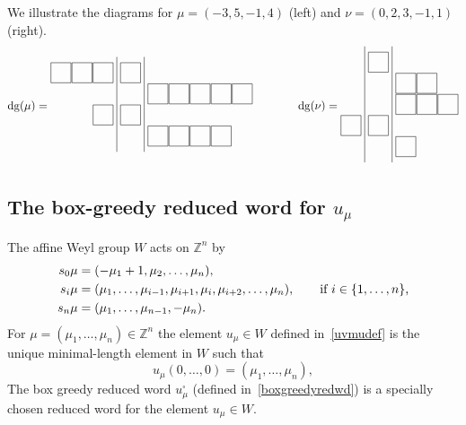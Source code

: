\documentclass[11pt]{article}
\theoremstyle{plain}
\theoremstyle{definition}
\newenvironment{example}
  {\pushQED{\qed}\exampleinner}
  {\popQED\endexampleinner}
\theoremstyle{remark}
\numberwithin{equation}{section}
\newcommand{\dg}{\mathrm{dg}}
\def\ZZ{\mathbb{Z}}
\newcounter{r}
\newcounter{s}
\begin{document}
\begin{example}
We illustrate the diagrams for $\mu = (-3,5,-1,4)$ (left) and $\nu = (0,2,3,-1,1)$ (right). 
$$
\dg(\mu)= \begin{matrix}
\begin{tikzpicture}[scale = 0.65]
\foreach \x\y in {1/-3, 1/-2, 1/-1, 1/0, 2/1, 2/2, 2/3, 2/4, 2/5, 3/-1, 3/0, 4/1, 4/2, 4/3, 4/4}{
    \pgfmathtruncatemacro{\shift}{(\y>0) - (\y<0)}
    \begin{scope}[xshift = 0.3*\shift cm]
    \draw[thin] (\y+0.025, -\x-0.025) rectangle (0.975+\y, -\x-0.975);
    \draw (0.5+\y,-\x-0.5) node (\x\y) {};
    \end{scope}
}
\draw (-0.15, -0.75) -- (-0.15, -5.25);
\draw (1.15, -0.75) -- (1.15, -5.25);
\end{tikzpicture}
\end{matrix}
\qquad \qquad 
\dg(\nu)=\begin{matrix}
\begin{tikzpicture}[scale = 0.65]
\foreach \x\y in {1/0, 2/1, 2/2,  3/1, 3/2, 3/3, 4/0, 4/-1, 5/1}{
    \pgfmathtruncatemacro{\shift}{(\y>0) - (\y<0)}
    \begin{scope}[xshift = 0.3*\shift cm]
    \draw[thin] (\y+0.025, -\x-0.025) rectangle (0.975+\y, -\x-0.975);
    \draw (0.5+\y,-\x-0.5) node (\x\y) {};
    \end{scope}
}
\draw (-0.15, -0.75) -- (-0.15, -6.25);
\draw (1.15, -0.75) -- (1.15, -6.25);
\end{tikzpicture}
\end{matrix}
$$
\end{example}


\subsection{The box-greedy reduced word for $u_\mu$}
\label{section:bgrw}

The affine Weyl group $W$ acts on $\ZZ^n$ by
\begin{align}
s_0\mu &=   (-\mu_1+1, \mu_2, \ldots, \mu_n), \nonumber \\
s_i\mu &= (\mu_{1}, \ldots, \mu_{i-1}, \mu_{i+1}, \mu_{i}, \mu_{i+2}, \ldots, \mu_n), \qquad  \hbox{if $i\in \{1, \ldots, n\}$,}  
\label{WonZn} 
\\
s_n \mu &= (\mu_1, \ldots, \mu_{n-1}, -\mu_n). \nonumber
\end{align}
For $\mu = (\mu_{1}, \ldots, \mu_{n}) \in \ZZ^n$ the element $u_\mu\in W$ defined in~\eqref{uvmudef} is the 
unique minimal-length element in $W$ such that
\begin{equation}
u_\mu(0,\ldots, 0) = (\mu_1, \ldots, \mu_n),
\label{umudefn}
\end{equation}
The box greedy reduced word $u_\mu^\square$ (defined in~\eqref{boxgreedyredwd})
is a specially chosen reduced word for the element $u_\mu\in W$.
\end{document}
